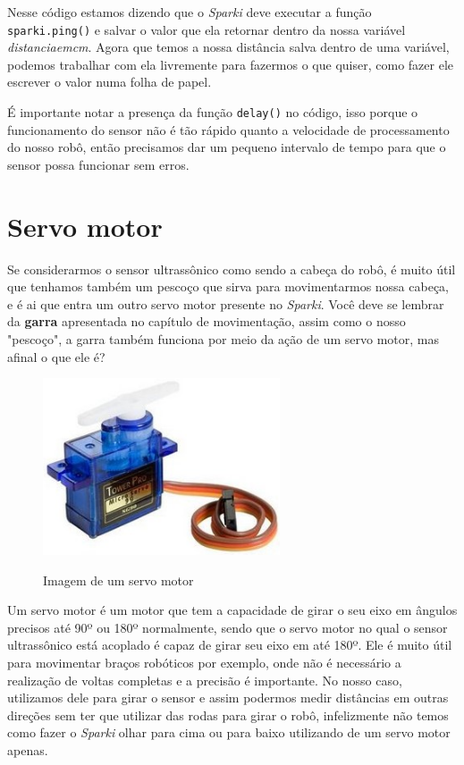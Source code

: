     Nesse código estamos dizendo que o \textit{Sparki} deve executar a função \texttt{sparki.ping()} e salvar o valor que ela retornar dentro da nossa variável \textit{distancia\underline{\hspace{.1in}}em\underline{\hspace{.1in}}cm}. Agora que temos a nossa distância salva dentro de uma variável, podemos trabalhar com ela livremente para fazermos o que quiser, como fazer ele escrever o valor numa folha de papel.
    
    É importante notar a presença da função \texttt{delay()} no código, isso porque o funcionamento do sensor não é tão rápido quanto a velocidade de processamento do nosso robô, então precisamos dar um pequeno intervalo de tempo para que o sensor possa funcionar sem erros.
    
\section{Servo motor}
    
    Se considerarmos o sensor ultrassônico como sendo a cabeça do robô, é muito útil que tenhamos também um pescoço que sirva para movimentarmos nossa cabeça, e é ai que entra um outro servo motor presente no \textit{Sparki}. Você deve se lembrar da \textbf{garra} apresentada no capítulo de movimentação, assim como o nosso "pescoço", a garra também funciona por meio da ação de um servo motor, mas afinal o que ele é?
    
    \begin{figure}[h]
    \caption{Imagem de um servo motor}
    
    \centering 
    \includegraphics[width=7cm]{Figuras/servo.jpg}
    \label{figura:servo.jpeg}
    \end{figure}
    
    Um servo motor é um motor que tem a capacidade de girar o seu eixo em ângulos precisos até 90º ou 180º normalmente, sendo que o servo motor no qual o sensor ultrassônico está acoplado é capaz de girar seu eixo em até 180º. Ele é muito útil para movimentar braços robóticos por exemplo, onde não é necessário a realização de voltas completas e a precisão é importante. No nosso caso, utilizamos dele para girar o sensor e assim podermos medir distâncias em outras direções sem ter que utilizar das rodas para girar o robô, infelizmente não temos como fazer o \textit{Sparki} olhar para cima ou para baixo utilizando de um servo motor apenas.
    
